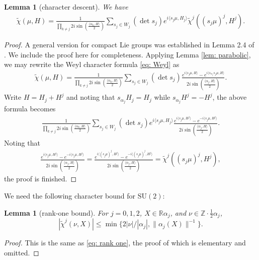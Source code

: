 \documentclass{amsart}
\numberwithin{equation}{section}
\newtheorem{lem}[thm]{Lemma}
\numberwithin{equation}{section}
\begin{document}
\begin{lem}[character descent]\label{lem: cha}
We have 
\begin{align}\label{eq: cha}
    \widetilde{\chi}(\mu, H)=\frac{1}{\prod_{k\neq j}2i\sin\left(\frac{\langle\alpha_k, H\rangle}{2}\right)}\sum_{s_j\in W_j} (\det s_j) 
e^{i\langle s_j\mu,H_{j}\rangle}\widetilde{\chi}^j((s_j\mu)^j, H^j).
\end{align}
\end{lem}
\begin{proof}
A general version for compact Lie groups was established in Lemma 2.4 of \cite{Zha26}. We include the proof here for completeness.
Applying Lemma \ref{lem: parabolic}, we may rewrite the Weyl character formula \eqref{eq: Weyl} as 
\begin{align*}
\widetilde{\chi}(\mu, H)=\frac{1}{
    \prod_{k\neq j}2i\sin\left(\frac{\langle \alpha_k,H\rangle}{2}\right)
    }\sum_{s_j\in W_j} (\det s_j)\frac{e^{i\langle s_j\mu,H\rangle}-e^{i\langle s_{\alpha_j}s_j\mu,H\rangle}}{2i\sin\left(\frac{\langle \alpha_j,H\rangle}{2}\right)}.
\end{align*}
Write $H=H_j+H^j$ and noting that $s_{\alpha_j}H_j=H_j$ while $s_{\alpha_j}H^j=-H^j$, the above formula becomes 
\begin{align*}
    \frac{1}{
    \prod_{k\neq j}2i\sin\left(\frac{\langle \alpha_k,H\rangle}{2}\right)
    }\sum_{s_j\in W_j} (\det s_j)
    e^{i\langle s_j\mu,H_j\rangle}
    \frac{e^{i\langle s_j\mu,H^j\rangle}-e^{-i\langle s_j\mu,H^j\rangle}}{2i\sin\left(\frac{\langle \alpha_j,H\rangle}{2}\right)}.
\end{align*}
Noting that 
\begin{align*}
    \frac{e^{i\langle s_j\mu,H^j\rangle}-e^{-i\langle s_j\mu,H^j\rangle}}{2i\sin\left(\frac{\langle \alpha_j,H\rangle}{2}\right)}=\frac{e^{i\langle (s_j\mu)^j,H^j\rangle}-e^{-i\langle (s_j\mu)^j,H^j\rangle}}{2i\sin\left(\frac{\langle \alpha_j,H\rangle}{2}\right)} =\widetilde{\chi}^j((s_j\mu)^j, H^j),
\end{align*}
the proof is finished. 
\end{proof}

 


We need the following character bound for $\mathrm{SU}(2)$: 

\begin{lem}[rank-one bound]\label{lem: simple cha bd}
    For $j=0,1,2$, $X\in\mathbb{R} \alpha_j$, and $\nu\in \mathbb{Z}\cdot\frac12\alpha_j$, 
$$|\widetilde{\chi}^j (\nu, X)|\leq  \min\{2|\nu|/|\alpha_j|,\|\alpha_j(X)\|^{-1}\}.$$
\end{lem}
\begin{proof}
    This is the same as \eqref{eq: rank one}, the proof of which is elementary and omitted. 
\end{proof}
\end{document}
